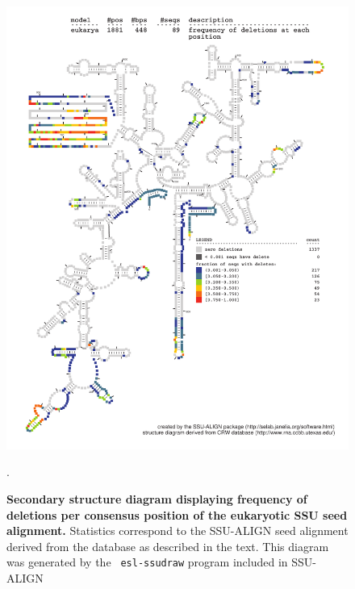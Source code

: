 \begin{figure}
\begin{center}
\includegraphics[width=5.7in]{Figures/eukarya-0p1-dall}
\end{center}
\caption[Secondary structure diagram displaying frequency of deletions
  per consensus position of the eukaryotic SSU seed
  alignment]{\textbf{Secondary structure diagram displaying frequency 
  of deletions per consensus position of the eukaryotic SSU seed
  alignment.} Statistics correspond to the SSU-ALIGN seed
  alignment derived from the  database \cite{CannoneGutell02}
  as described in the text. This diagram was generated by the {\tt
  esl-ssudraw} program included in SSU-ALIGN}.
\label{fig:eukdel}
\end{figure}


